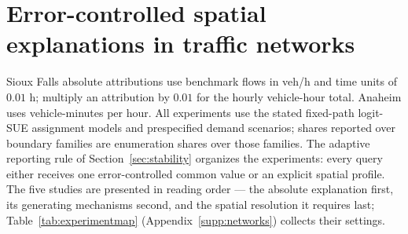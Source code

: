 \section{Error-controlled spatial explanations in traffic networks}\label{sec:numerics}
Sioux Falls absolute attributions use benchmark flows in veh/h and time units of $0.01$ h; multiply an attribution by $0.01$ for the hourly vehicle-hour total. Anaheim uses vehicle-minutes per hour. All experiments use the stated fixed-path logit-SUE assignment models and prespecified demand scenarios; shares reported over boundary families are enumeration shares over those families. The adaptive reporting rule of Section~\ref{sec:stability} organizes the experiments: every query either receives one error-controlled common value or an explicit spatial profile. The five studies are presented in reading order --- the absolute explanation first, its generating mechanisms second, and the spatial resolution it requires last; Table~\ref{tab:experimentmap} (Appendix~\ref{supp:networks}) collects their settings.
